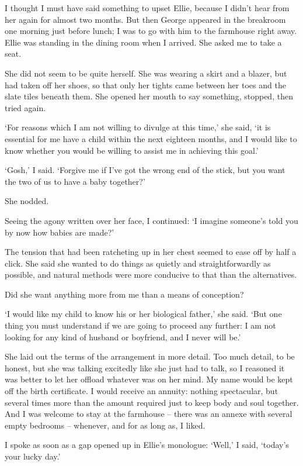 I thought I must have said something to upset Ellie, because I didn't hear from her again for almost two months. But then George appeared in the breakroom one morning just before lunch; I was to go with him to the farmhouse right away. Ellie was standing in the dining room when I arrived. She asked me to take a seat.

She did not seem to be quite herself. She was wearing a skirt and a blazer, but had taken off her shoes, so that only her tights came between her toes and the slate tiles beneath them. She opened her mouth to say something, stopped, then tried again.

`For reasons which I am not willing to divulge at this time,' she said, `it is essential for me have a child within the next eighteen months, and I would like to know whether you would be willing to assist me in achieving this goal.'

`Gosh,' I said. `Forgive me if I've got the wrong end of the stick, but you want the two of us to have a baby together?'

She nodded.

Seeing the agony written over her face, I continued: `I imagine someone's told you by now how babies are made?'

The tension that had been ratcheting up in her chest seemed to ease off by half a click. She said she wanted to do things as quietly and straightforwardly as possible, and natural methods were more conducive to that than the alternatives.

Did she want anything more from me than a means of conception?

`I would like my child to know his or her biological father,' she said. `But one thing you must understand if we are going to proceed any further: I am not looking for any kind of husband or boyfriend, and I never will be.'

She laid out the terms of the arrangement in more detail. Too much detail, to be honest, but she was talking excitedly like she just had to talk, so I reasoned it was better to let her offload whatever was on her mind. My name would be kept off the birth certificate. I would receive an annuity: nothing spectacular, but several times more than the amount required just to keep body and soul together. And I was welcome to stay at the farmhouse -- there was an annexe with several empty bedrooms -- whenever, and for as long as, I liked.

I spoke as soon as a gap opened up in Ellie's monologue: `Well,' I said, `today's your lucky day.'
